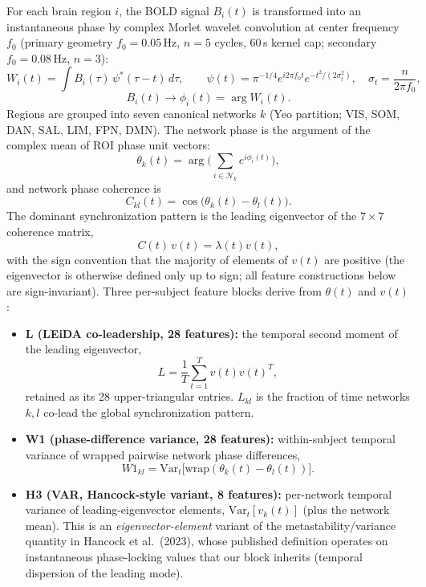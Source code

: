 \documentclass{article}
\begin{document}
For each brain region $i$, the BOLD signal $B_i(t)$ is transformed into an instantaneous phase by complex Morlet wavelet convolution at center frequency $f_0$ (primary geometry $f_0{=}0.05$\,Hz, $n{=}5$ cycles, $60$\,s kernel cap; secondary $f_0{=}0.08$\,Hz, $n{=}3$):
\begin{equation}
W_i(t)=\int B_i(\tau)\,\psi^{*}(\tau-t)\,d\tau,\qquad
\psi(t)=\pi^{-1/4}e^{i2\pi f_0 t}e^{-t^2/(2\sigma_t^2)},\quad \sigma_t=\frac{n}{2\pi f_0},
\end{equation}
\begin{equation}
B_i(t)\rightarrow\phi_i(t)=\arg W_i(t).
\end{equation}
Regions are grouped into seven canonical networks $k$ (Yeo partition; VIS, SOM, DAN, SAL, LIM, FPN, DMN). The network phase is the argument of the complex mean of ROI phase unit vectors:
\begin{equation}
\theta_k(t)=\arg\Big(\sum_{i\in\mathcal{N}_k} e^{i\phi_i(t)}\Big),
\end{equation}
and network phase coherence is
\begin{equation}
C_{kl}(t)=\cos\!\big(\theta_k(t)-\theta_l(t)\big).
\end{equation}
The dominant synchronization pattern is the leading eigenvector of the $7\times 7$ coherence matrix,
\begin{equation}
C(t)\,v(t)=\lambda(t)v(t),
\end{equation}
with the sign convention that the majority of elements of $v(t)$ are positive (the eigenvector is otherwise defined only up to sign; all feature constructions below are sign-invariant). Three per-subject feature blocks derive from $\theta(t)$ and $v(t)$:

\begin{itemize}
\item \textbf{L (LEiDA co-leadership, 28 features):} the temporal second moment of the leading eigenvector,
\begin{equation}
L=\frac{1}{T}\sum_{t=1}^{T} v(t)v(t)^{T},
\end{equation}
retained as its 28 upper-triangular entries. $L_{kl}$ is the fraction of time networks $k,l$ co-lead the global synchronization pattern.
\item \textbf{W1 (phase-difference variance, 28 features):} within-subject temporal variance of wrapped pairwise network phase differences,
\begin{equation}
W1_{kl}=\mathrm{Var}_t\big[\mathrm{wrap}(\theta_k(t)-\theta_l(t))\big].
\end{equation}
\item \textbf{H3 (VAR, Hancock-style variant, 8 features):} per-network temporal variance of leading-eigenvector elements, $\mathrm{Var}_t[v_k(t)]$ (plus the network mean). This is an \emph{eigenvector-element} variant of the metastability/variance quantity in Hancock et al.\ (2023), whose published definition operates on instantaneous phase-locking values that our block inherits (temporal dispersion of the leading mode).
\end{itemize}
\end{document}
